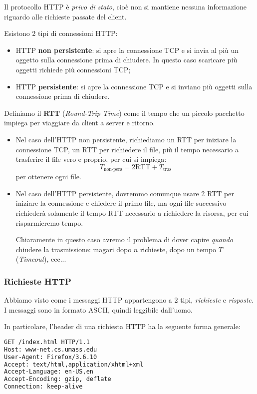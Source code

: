 \documentclass[a4paper,11pt]{article}
\begin{document}
Il protocollo HTTP è \textit{privo di stato}, cioè non si mantiene nessuna informazione riguardo alle richieste passate del client.

Esistono 2 tipi di connessioni HTTP:
\begin{itemize}
	\item HTTP \textbf{non persistente}: si apre la connessione TCP e si invia al più un oggetto sulla connessione prima di chiudere. In questo caso scaricare più oggetti richiede più connessioni TCP; 
	\item HTTP \textbf{persistente}: si apre la connessione TCP e si inviano più oggetti sulla connessione prima di chiudere.
\end{itemize}

Definiamo il \textbf{RTT} (\textit{Round-Trip Time}) come il tempo che un piccolo pacchetto impiega per viaggiare da client a server e ritorno.

\begin{itemize}
	\item 
Nel caso dell'HTTP non persistente, richiediamo un RTT per iniziare la connessione TCP, un RTT per richiedere il file, più il tempo necessario a trasferire il file vero e proprio, per cui si impiega:
$$
T_{\text{non-pers}} = 2 \text{RTT} + T_{\text{tras}}
$$
per ottenere ogni file.
	\item
Nel caso dell'HTTP persistente, dovremmo comunque usare 2 RTT per iniziare la connessione e chiedere il primo file, ma ogni file successivo richiederà solamente il tempo RTT necessario a richiedere la risorsa, per cui risparmieremo tempo.

Chiaramente in questo caso avremo il problema di dover capire \textit{quando} chiudere la trasmissione: magari dopo $n$ richieste, dopo un tempo $T$ (\textit{Timeout}), ecc...
\end{itemize}

\subsubsection{Richieste HTTP}
Abbiamo visto come i messaggi HTTP appartengono a 2 tipi, \textit{richieste} e \textit{risposte}.
I messaggi sono in formato ASCII, quindi leggibile dall'uomo.

In particolare, l'header di una richiesta HTTP ha la seguente forma generale:
\begin{lstlisting}[language=html,style=codestyle]	
GET /index.html HTTP/1.1
Host: www-net.cs.umass.edu
User-Agent: Firefox/3.6.10
Accept: text/html,application/xhtml+xml
Accept-Language: en-US,en
Accept-Encoding: gzip, deflate
Connection: keep-alive
\end{lstlisting}
\end{document}
